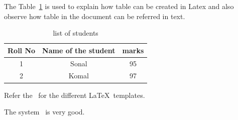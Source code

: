 
The Table~\ref{tab:listOfStudents} is used to explain how table can be created in Latex and also observe how table in the document can be referred  in text.


\begin{table}[htbp]
	\centering
		\begin{tabular}{|c|c|c|}
			\hline Roll No & Name of the student & marks \\
			\hline 1 & Sonal & 95 \\
			\hline 2 & Komal & 97 \\
			\hline
\end{tabular}
\caption{list of students}
\label{tab:listOfStudents}
\end{table}


Refer the~\cite{sanjay} for the different \LaTeX\ templates.


The system~\cite{sanjay12} is very good.

